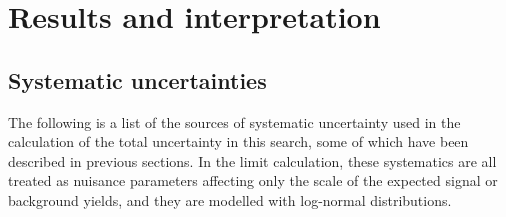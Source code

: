 \chapter{Results and interpretation\label{sec:results}}

\section{Systematic uncertainties\label{sec:results-systematics}}

The following is a list of the sources of systematic uncertainty used in the calculation of the total uncertainty in this search, some of which have been described in previous sections. In the limit calculation, these systematics are all treated as nuisance parameters affecting only the scale of the expected signal or background yields, and they are modelled with log-normal distributions.


